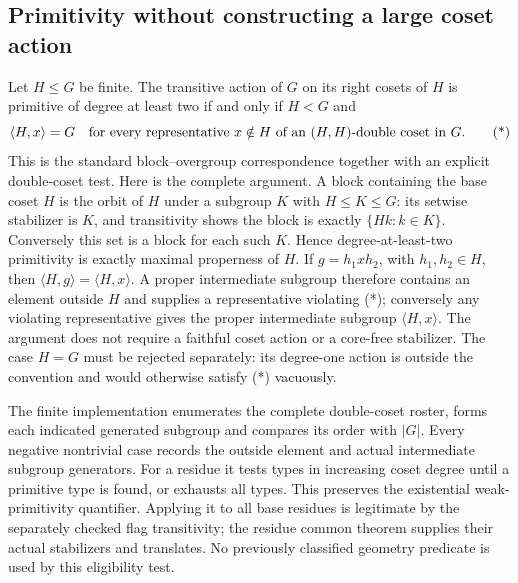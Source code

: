 \subsection{Primitivity without constructing a large coset action}
Let $H\leq G$ be finite. The transitive action of $G$ on its right cosets
of $H$ is primitive of degree at least two if and only if $H<G$ and
\[
 \langle H,x\rangle=G
 \quad\hbox{for every representative }x\notin H
 \hbox{ of an }(H,H)\hbox{-double coset in }G.                 \tag{*}
\]
This is the standard block--overgroup correspondence together with an
explicit double-coset test. Here is the complete argument. A block
containing the base coset $H$ is the orbit of $H$ under a subgroup
$K$ with $H\leq K\leq G$: its setwise stabilizer is $K$, and transitivity
shows the block is exactly $\{Hk:k\in K\}$. Conversely this set is a
block for each such $K$. Hence degree-at-least-two primitivity is exactly
maximal properness of $H$. If $g=h_1xh_2$, with $h_1,h_2\in H$, then
$\langle H,g\rangle=\langle H,x\rangle$. A proper intermediate subgroup
therefore contains an element outside $H$ and supplies a representative
violating (*); conversely any violating representative gives the proper
intermediate subgroup $\langle H,x\rangle$. The argument does not require
a faithful coset action or a core-free stabilizer. The case $H=G$ must be
rejected separately: its degree-one action is outside the convention and
would otherwise satisfy (*) vacuously.

The finite implementation enumerates the complete double-coset roster,
forms each indicated generated subgroup and compares its order with $|G|$.
Every negative nontrivial case records the outside element and actual
intermediate subgroup generators. For a residue it tests types in
increasing coset degree until a primitive type is found, or exhausts all
types. This preserves the existential weak-primitivity quantifier.
Applying it to all base residues is legitimate by the separately checked
flag transitivity; the residue common theorem supplies their actual
stabilizers and translates. No previously classified geometry predicate
is used by this eligibility test.

